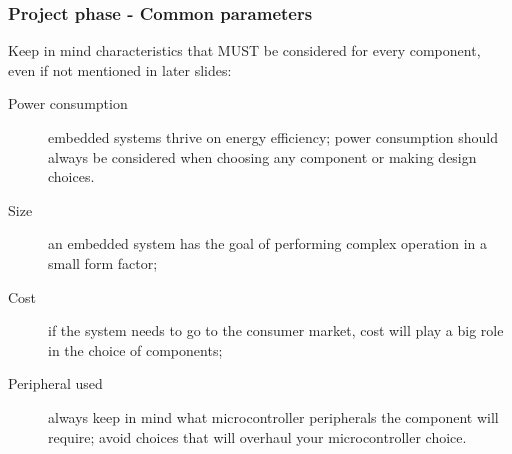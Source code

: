 \documentclass[11pt,xcolor=table,aspectratio=169]{beamer}
\begin{document}
	\begin{frame}
		\frametitle{Project phase - Common parameters}
		Keep in mind characteristics that MUST be considered for every component, even if not mentioned in later slides:
		\begin{description}
			\item[Power consumption] embedded systems thrive on energy efficiency; power consumption should always be considered when choosing any component or making design choices.
			\item[Size] an embedded system has the goal of performing complex operation in a small form factor;
			\item[Cost] if the system needs to go to the consumer market, cost will play a big role in the choice of components;
			\item[Peripheral used] always keep in mind what microcontroller peripherals the component will require; avoid choices that will overhaul your microcontroller choice.
		\end{description}
	\end{frame}
\end{document}
